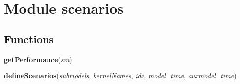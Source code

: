%
%
%


\section{Module scenarios}

    \label{scenarios}


  \subsection{Functions}

    \label{scenarios:getPerformance}

    \vspace{0.5ex}

\hspace{.8\funcindent}\begin{boxedminipage}{\funcwidth}

    \raggedright \textbf{getPerformance}(\textit{sm})

\setlength{\parskip}{2ex}
\setlength{\parskip}{1ex}
    \end{boxedminipage}

    \label{scenarios:defineScenarios}

    \vspace{0.5ex}

\hspace{.8\funcindent}\begin{boxedminipage}{\funcwidth}

    \raggedright \textbf{defineScenarios}(\textit{submodels}, \textit{kernelNames}, \textit{idx}, \textit{model\_time}, \textit{auxmodel\_time})

\setlength{\parskip}{2ex}
\setlength{\parskip}{1ex}
    \end{boxedminipage}

